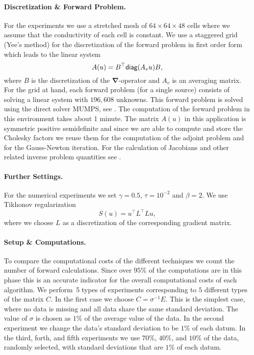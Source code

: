 \documentclass[12pt]{article}
\renewcommand{\vec}[1]{\ensuremath{\mathbf{#1}}}
\newcommand{\grad}{\ensuremath {\vec \nabla}}
\begin{document}
\paragraph{Discretization \& Forward Problem.} For the experiments we use a stretched mesh of $64 \times 64 \times 48$ cells where we assume that the conductivity of each cell is constant. We use a staggered grid (Yee's method) for the discretization of the forward problem in first order form \cite{yee,mm89,na,ha} which leads to the linear system
$$ A(u) = B^{\top}{\sf diag}(A_{v}u)B, $$
where $B$ is the discretization of the $\grad$-operator and $A_{v}$ is an averaging matrix. For the grid at hand, each forward problem (for a single source) consists of solving a linear system with $196,608$ unknowns. This forward problem is solved using the direct solver MUMPS, see \cite{MUMPS}. The computation of the forward problem in this environment takes about 1 minute. The matrix $A(u)$ in this application is symmetric positive semidefinite and since we are able to compute and store the Cholesky factors we reuse them for the computation of the adjoint problem and for the Gauss-Newton iteration.
For the calculation of Jacobians and other related inverse problem quantities see \cite{hao2}.

\paragraph{Further Settings.} For the numerical experiments we set $\gamma  = 0.5$, $\tau = 10^{-2}$ and $\beta=2$.
We use Tikhonov regularization
$$ S(u) = u^{\top} L^{\top}Lu, $$
where we choose $L$ as a discretization of the corresponding gradient matrix.

\paragraph{Setup \& Computations.} To compare the computational costs of the different techniques we count the number of forward calculations. Since over $95\%$ of the computations are in this phase this is an accurate indicator for the overall computational costs of each algorithm. We perform~5 types of experiments corresponding to $5$ different types of the matrix $C$. In the first case we choose $C=\sigma^{-1}E$. This is the simplest case, where no data is missing and all data share the same standard deviation. The value of $\sigma$ is chosen as $1\%$ of the average value of the data. In the second experiment we change the data's standard deviation to be $1\%$ of each datum.
In the third, forth, and fifth experiments we use $70\%$, $40\%$, and $10\%$ of the data, randomly selected, with standard deviations
that are $1\%$ of each datum.
\end{document}
